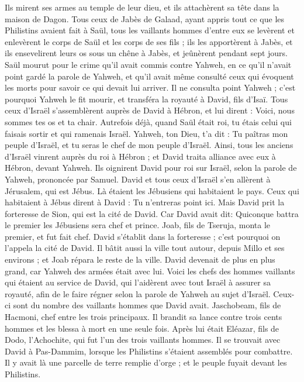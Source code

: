 \begin{multicols}{2}
Ils mirent ses armes au temple de leur dieu, et ils attachèrent sa tête dans la maison de Dagon.
Tous ceux de Jabès de Galaad, ayant appris tout ce que les Philistins avaient fait à Saül,
tous les vaillants hommes d’entre eux se levèrent et enlevèrent le corps de Saül et les corps de ses fils ; ils les apportèrent à Jabès, et ils ensevelirent leurs os sous un chêne à Jabès, et jeûnèrent pendant sept jours.
Saül mourut pour le crime qu'il avait commis contre Yahweh, en ce qu'il n'avait point gardé la parole de Yahweh, et qu'il avait même consulté ceux qui évoquent les morts pour savoir ce qui devait lui arriver.
Il ne consulta point Yahweh ; c'est pourquoi Yahweh le fit mourir, et transféra la royauté à David, fils d'Isaï.
\VerseOne{}Tous ceux d'Israël s'assemblèrent auprès de David à Hébron, et lui dirent : Voici, nous sommes tes os et ta chair.
Autrefois déjà, quand Saül était roi, tu étais celui qui faisais sortir et qui ramenais Israël. Yahweh, ton Dieu, t'a dit : Tu paîtras mon peuple d'Israël, et tu seras le chef de mon peuple d'Israël.
Ainsi, tous les anciens d'Israël vinrent auprès du roi à Hébron ; et David traita alliance avec eux à Hébron, devant Yahweh. Ils oignirent David pour roi sur Israël, selon la parole de Yahweh, prononcée par Samuel.
David et tous ceux d'Israël s'en allèrent à Jérusalem, qui est Jébus. Là étaient  les Jébusiens qui habitaient le pays.
Ceux qui habitaient à Jébus dirent à David : Tu n'entreras point ici. Mais David prit la forteresse de Sion, qui est la cité de David.
Car David avait dit: Quiconque battra le premier les Jébusiens sera chef et prince. Joab, fils de Tseruja, monta le premier, et fut fait chef.
David s’établit dans la forteresse ; c'est pourquoi on l'appela la cité de David.
Il bâtit aussi la ville tout autour, depuis Millo et ses environs ; et Joab répara le reste de la ville.
David devenait de plus en plus grand, car Yahweh des armées était avec lui.
Voici les chefs des hommes vaillants qui étaient au service de David, qui l’aidèrent avec tout Israël à assurer sa royauté, afin de le faire régner selon la parole de Yahweh au sujet d’Israël.
Ceux-ci sont du nombre des vaillants hommes que David avait. Jaschobeam, fils de Hacmoni, chef entre les trois principaux. Il brandit sa lance contre trois cents hommes et les blessa à mort en une seule fois.
Après lui était Eléazar, fils de Dodo, l'Achochite, qui fut l’un des trois vaillants hommes.
Il se trouvait avec David à Pas-Dammim, lorsque les Philistins s'étaient assemblés pour combattre. Il y avait là une parcelle de terre remplie d'orge ; et le peuple fuyait devant les Philistins.

\end{multicols}
